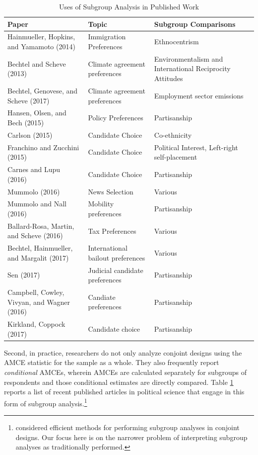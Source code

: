 \documentclass[a4paper,12pt]{article}\usepackage[]{graphicx}\usepackage[]{color}
\begin{document}
\begin{table}
\caption{Uses of Subgroup Analysis in Published Work}\label{tab:papers}
\begin{center}
\footnotesize
\begin{tabular}{p{2.5in} p{2in} p{2in}}\toprule
\textbf{Paper} & \textbf{Topic} & \textbf{Subgroup Comparisons} \\ \midrule
Hainmueller, Hopkins, and Yamamoto (2014) & Immigration Preferences & Ethnocentrism \\
Bechtel and Scheve (2013) & Climate agreement preferences & Environmentalism and International Reciprocity Attitudes \\
Bechtel, Genovese, and Scheve (2017) & Climate agreement preferences & Employment sector emissions \\
Hansen, Olsen, and Bech (2015) & Policy Preferences & Partisanship \\
Carlson (2015) & Candidate Choice & Co-ethnicity \\
Franchino and Zucchini (2015) & Candidate Choice & Political Interest, Left-right self-placement\\
Carnes and Lupu (2016) & Candidate Choice & Partisanship \\
Mummolo (2016) & News Selection & Various\\
Mummolo and Nall (2016) & Mobility preferences & Partisanship \\
Ballard-Rosa, Martin, and Scheve (2016) & Tax Preferences & Various\\
Bechtel, Hainmueller, and Margalit (2017) & International bailout preferences & Various\\
Sen (2017) & Judicial candidate preferences & Partisanship \\
Campbell, Cowley, Vivyan, and Wagner (2016) & Candiate preferences & Partisanship \\
Kirkland, Coppock (2017) & Candidate choice & Partisanship \\ \bottomrule
\end{tabular}
\end{center}
\end{table}

Second, in practice, researchers do not only analyze conjoint designs using the AMCE statistic for the sample as a whole. They also frequently report \textit{conditional} AMCEs, wherein AMCEs are calculated separately for subgroups of respondents and those conditional estimates are directly compared. Table \ref{tab:papers} reports a list of recent published articles in political science that engage in this form of subgroup analysis.\footnote{\citet{RatkovicTingley2017} considered efficient methods for performing subgroup analyses in conjoint designs. Our focus here is on the narrower problem of interpreting subgroup analyses as traditionally performed.}
\end{document}
